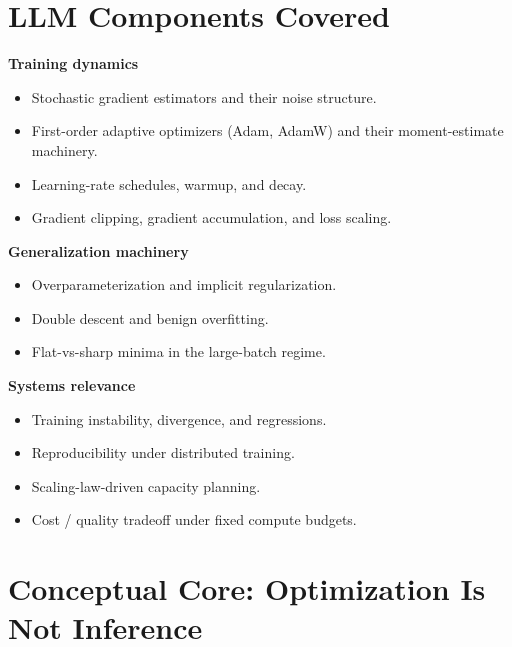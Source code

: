 \section{LLM Components Covered}

\textbf{Training dynamics}
\begin{itemize}
  \item Stochastic gradient estimators and their noise structure.
  \item First-order adaptive optimizers (Adam, AdamW) and their
        moment-estimate machinery.
  \item Learning-rate schedules, warmup, and decay.
  \item Gradient clipping, gradient accumulation, and loss scaling.
\end{itemize}

\textbf{Generalization machinery}
\begin{itemize}
  \item Overparameterization and implicit regularization.
  \item Double descent and benign overfitting.
  \item Flat-vs-sharp minima in the large-batch regime.
\end{itemize}

\textbf{Systems relevance}
\begin{itemize}
  \item Training instability, divergence, and regressions.
  \item Reproducibility under distributed training.
  \item Scaling-law-driven capacity planning.
  \item Cost / quality tradeoff under fixed compute budgets.
\end{itemize}

\section{Conceptual Core: Optimization Is Not Inference}

